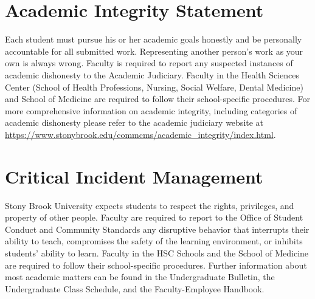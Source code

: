 \documentclass[11pt]{article}
\begin{document}
\section*{Academic Integrity Statement}

Each student must pursue his or her academic goals honestly and be personally accountable for all submitted work. Representing another person's work as your own is always wrong. Faculty is required to report any suspected instances of academic dishonesty to the Academic Judiciary. Faculty in the Health Sciences Center (School of Health Professions, Nursing, Social Welfare, Dental Medicine) and School of Medicine are required to follow their school-specific procedures. For more comprehensive information on academic integrity, including categories of academic dishonesty please refer to the academic judiciary website at\\ \href{https://www.stonybrook.edu/commcms/academic_integrity/index.html}{https://www.stonybrook.edu/commcms/academic\_integrity/index.html}.

\section*{Critical Incident Management}

Stony Brook University expects students to respect the rights, privileges, and property of other people. Faculty are required to report to the Office of Student Conduct and Community Standards any disruptive behavior that interrupts their ability to teach, compromises the safety of the learning environment, or inhibits students' ability to learn. Faculty in the HSC Schools and the School of Medicine are required to follow their school-specific procedures. Further information about most academic matters can be found in the Undergraduate Bulletin, the Undergraduate Class Schedule, and the Faculty-Employee Handbook.
\end{document}
